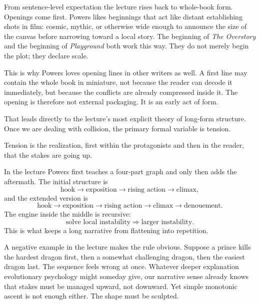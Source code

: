 From sentence-level expectation the lecture rises back to whole-book form. Openings come first. Powers likes beginnings that act like distant establishing shots in film: cosmic, mythic, or otherwise wide enough to announce the size of the canvas before narrowing toward a local story. The beginning of \emph{The Overstory} and the beginning of \emph{Playground} both work this way. They do not merely begin the plot; they declare scale.

This is why Powers loves opening lines in other writers as well. A first line may contain the whole book in miniature, not because the reader can decode it immediately, but because the conflicts are already compressed inside it. The opening is therefore not external packaging. It is an early act of form.

That leads directly to the lecture's most explicit theory of long-form structure. Once we are dealing with collision, the primary formal variable is tension.

\begin{definition}
Tension is the realization, first within the protagonists and then in the reader, that the stakes are going up.
\end{definition}

In the lecture Powers first teaches a four-part graph and only then adds the aftermath. The initial structure is
\begin{equation}
\text{hook} \to \text{exposition} \to \text{rising action} \to \text{climax},
\end{equation}
and the extended version is
\begin{equation}
\text{hook} \to \text{exposition} \to \text{rising action} \to \text{climax} \to \text{denouement}.
\end{equation}
The engine inside the middle is recursive:
\begin{equation}
\text{solve local instability} \Rightarrow \text{larger instability}.
\end{equation}
This is what keeps a long narrative from flattening into repetition.

A negative example in the lecture makes the rule obvious. Suppose a prince kills the hardest dragon first, then a somewhat challenging dragon, then the easiest dragon last. The sequence feels wrong at once. Whatever deeper explanation evolutionary psychology might someday give, our narrative sense already knows that stakes must be managed upward, not downward. Yet simple monotonic ascent is not enough either. The shape must be sculpted.

